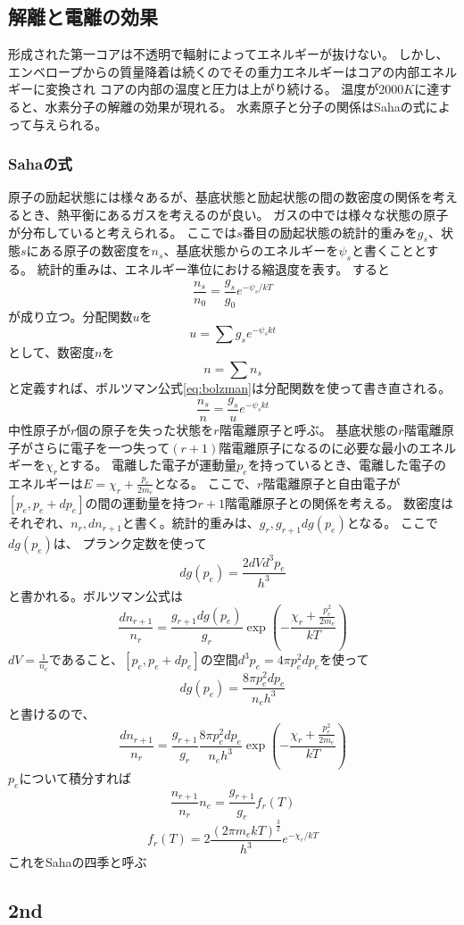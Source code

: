\documentclass{jsarticle}
\newcommand{\beq}{\begin{equation}}
\newcommand{\eeq}{\end{equation}}
\begin{document}
\subsection{解離と電離の効果}
形成された第一コアは不透明で輻射によってエネルギーが抜けない。
しかし、エンベロープからの質量降着は続くのでその重力エネルギーはコアの内部エネルギーに変換され
コアの内部の温度と圧力は上がり続ける。
温度が$2000K$に達すると、水素分子の解離の効果が現れる。
水素原子と分子の関係はSahaの式によって与えられる。
\subsubsection{Sahaの式}
原子の励起状態には様々あるが、基底状態と励起状態の間の数密度の関係を考えるとき、熱平衡にあるガスを考えるのが良い。
ガスの中では様々な状態の原子が分布していると考えられる。
ここでは$s$番目の励起状態の統計的重みを$g_s$、状態$s$にある原子の数密度を$n_s$、基底状態からのエネルギーを$\psi_s$と書くこととする。
統計的重みは、エネルギー準位における縮退度を表す。
すると
\beq
\frac{n_s}{n_0} = \frac{g_s}{g_0}e^{-\psi_s/kT}\label{eq:bolzman}
\eeq
が成り立つ。分配関数$u$を
\beq
    u = \sum g_s e^{-\psi_s kt} 
\eeq
として、数密度$n$を
\beq
    n = \sum n_s
\eeq
と定義すれば、ボルツマン公式\eqref{eq:bolzman}は分配関数を使って書き直される。
\beq
    \frac{n_s}{n} = \frac{g_s}{u} e^{-\psi_s kt}
\eeq
中性原子が$r$個の原子を失った状態を$r$階電離原子と呼ぶ。
基底状態の$r$階電離原子がさらに電子を一つ失って$(r+1)$階電離原子になるのに必要な最小のエネルギーを$\chi_r$とする。
電離した電子が運動量$p_e$を持っているとき、電離した電子のエネルギーは$E = \chi_r + \frac{p_e}{2m_e}$となる。
ここで、$r$階電離原子と自由電子が$[p_e, p_e + dp_e]$の間の運動量を持つ$r+1$階電離原子との関係を考える。
数密度はそれぞれ、$n_r, dn_{r+1}$と書く。統計的重みは、$g_r, g_{r+1}dg(p_e)$となる。
ここで$dg(p_e)$は、
プランク定数を使って
\beq
dg(p_e) = \frac{2dVd^3p_e}{h^3}
\eeq
と書かれる。ボルツマン公式は
\beq
\frac{dn_{r+1}}{n_r} = \frac{g_{r+1}dg(p_e)}{g_r} \exp\left(- \frac{\chi_r + \frac{p_e^2}{2m_e}}{kT}\right)
\eeq
$dV = \frac{1}{n_e}$であること、$[p_e, p_e + dp_e]$の空間$d^3p_e = 4\pi p_e^2 dp_e$を使って
\beq
dg(p_e) = \frac{8\pi p_e^2dp_e}{n_eh^3}
\eeq
と書けるので、
\beq
\frac{dn_{r+1}}{n_r} = \frac{g_{r+1}}{g_r}\frac{8\pi p_e^2dp_e}{n_eh^3} \exp\left(- \frac{\chi_r + \frac{p_e^2}{2m_e}}{kT}\right)
\eeq
$p_e$について積分すれば
\beq
\frac{n_{r+1}}{n_r} n_e = \frac{g_{r+1}}{g_r} f_r(T)
\eeq
\beq
f_r(T) = 2 \frac{(2\pi m_e kT)^{\frac{3}{2}}}{h^3} e^{-\chi_r/kT}
\eeq
これをSahaの四季と呼ぶ
\subsection{2nd}
\end{document}
